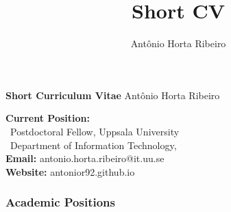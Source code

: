 \documentclass[10pt,letterpaper]{article} %
\title{Short CV}
\author{Ant\^onio Horta Ribeiro}
\begin{document}
{\Large \textbf{Short Curriculum Vitae} \hfill {\sc  Ant\^onio Horta Ribeiro}}

    \vspace{10pt}
\begin{multicols}{2}
    \small
    \textbf{Current Position:}\\
    \, Postdoctoral Fellow, Uppsala University \\
    \, Department of Information Technology,\\
    {\bf Email:} antonio.horta.ribeiro@it.uu.se\\
    {\bf Website:} antonior92.github.io
\end{multicols}

\subsubsection*{Academic Positions} %
\end{document}
